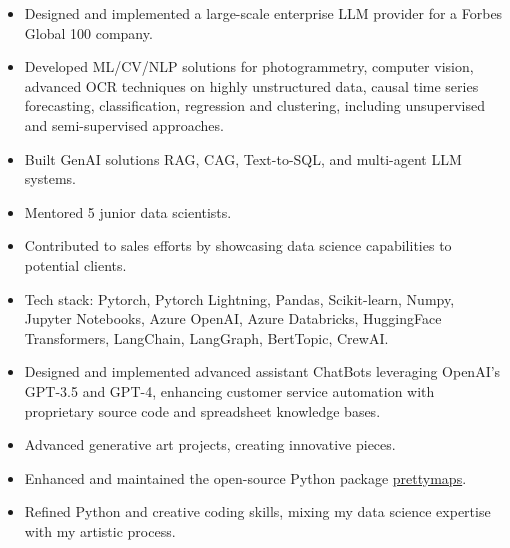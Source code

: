 \documentclass[10pt,a4paper]{altacv}
\begin{document}
{\small


\begin{itemize}
\item Designed and implemented a large-scale enterprise LLM provider for a Forbes Global 100 company.
\item Developed ML/CV/NLP solutions for photogrammetry, computer vision, advanced OCR techniques on highly unstructured data, causal time series forecasting, classification, regression and clustering, including unsupervised and semi-supervised approaches.
\item Built GenAI solutions RAG, CAG, Text-to-SQL, and multi-agent LLM systems.
\item Mentored 5 junior data scientists.
\item Contributed to sales efforts by showcasing data science capabilities to potential clients.
\item Tech stack: Pytorch, Pytorch Lightning, Pandas, Scikit-learn, Numpy, Jupyter Notebooks, Azure OpenAI, Azure Databricks, HuggingFace Transformers, LangChain, LangGraph, BertTopic, CrewAI.
\end{itemize}

\divider

\begin{itemize}
\item Designed and implemented advanced assistant ChatBots leveraging OpenAI's GPT-3.5 and GPT-4, enhancing customer service automation with proprietary source code and spreadsheet knowledge bases.
\end{itemize}

\divider

\begin{itemize}
\item Advanced generative art projects, creating innovative pieces.
\item Enhanced and maintained the open-source Python package \href{https://github.com/marceloprates/prettymaps}{prettymaps}.
\item Refined Python and creative coding skills, mixing my data science expertise with my artistic process.
\end{itemize}

}
\end{document}
